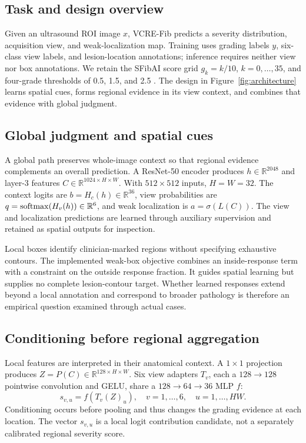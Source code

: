 \subsection{Task and design overview}
Given an ultrasound ROI image $x$, VCRE-Fib predicts a severity distribution, acquisition view, and weak-localization map. Training uses grading labels $y$, six-class view labels, and lesion-location annotations; inference requires neither view nor box annotations. We retain the SFibAI score grid $g_k=k/10$, $k=0,\ldots,35$, and four-grade thresholds of 0.5, 1.5, and 2.5 \citep{xu2026sfibai}. The design in Figure~\ref{fig:architecture} learns spatial cues, forms regional evidence in its view context, and combines that evidence with global judgment.

\subsection{Global judgment and spatial cues}
A global path preserves whole-image context so that regional evidence complements an overall prediction. A ResNet-50 encoder \citep{he2016resnet} produces $h\in\mathbb{R}^{2048}$ and layer-3 features $C\in\mathbb{R}^{1024\times H\times W}$. With $512\times512$ inputs, $H=W=32$. The context logits are $b=H_c(h)\in\mathbb{R}^{36}$, view probabilities are $q=\operatorname{softmax}(H_v(h))\in\mathbb{R}^{6}$, and weak localization is $a=\sigma(L(C))$. The view and localization predictions are learned through auxiliary supervision and retained as spatial outputs for inspection.

Local boxes identify clinician-marked regions without specifying exhaustive contours. The implemented weak-box objective combines an inside-response term with a constraint on the outside response fraction. It guides spatial learning but supplies no complete lesion-contour target. Whether learned responses extend beyond a local annotation and correspond to broader pathology is therefore an empirical question examined through actual cases.

\subsection{Conditioning before regional aggregation}
Local features are interpreted in their anatomical context. A $1\times1$ projection produces $Z=P(C)\in\mathbb{R}^{128\times H\times W}$. Six view adapters $T_v$, each a $128\rightarrow128$ pointwise convolution and GELU, share a $128\rightarrow64\rightarrow36$ MLP $f$:
\begin{equation}
s_{v,u}=f(T_v(Z)_u),\quad v=1,\ldots,6,\quad u=1,\ldots,HW .
\label{eq:local}
\end{equation}
Conditioning occurs before pooling and thus changes the grading evidence at each location. The vector $s_{v,u}$ is a local logit contribution candidate, not a separately calibrated regional severity score.

